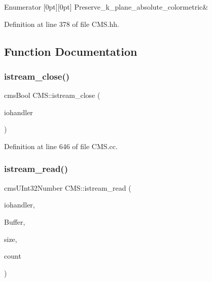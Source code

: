 \begin{DoxyEnumFields}{Enumerator}
[0pt][0pt]{}\mbox{\label{namespace_c_m_s_aabe6afbe3c2cd6188befc3096f1ea069ad691fc3212388b53f8e3d96349c66c82}} 
Preserve\+\_\+k\+\_\+plane\+\_\+absolute\+\_\+colormetric&\\
\hline

\end{DoxyEnumFields}


Definition at line 378 of file C\+M\+S.\+hh.



\subsection{Function Documentation}
\mbox{\label{namespace_c_m_s_a60036a5e1db6c4320d3ce599758c9101}} 
\subsubsection{\texorpdfstring{istream\+\_\+close()}{istream\_close()}}
{\footnotesize\ttfamily cms\+Bool C\+M\+S\+::istream\+\_\+close (\begin{DoxyParamCaption}\item[{cms\+I\+O\+H\+A\+N\+D\+L\+ER $\ast$}]{iohandler }\end{DoxyParamCaption})}



Definition at line 646 of file C\+M\+S.\+cc.

\mbox{\label{namespace_c_m_s_a88c40f3fde62e521d5f3b4055e6854e6}} 
\subsubsection{\texorpdfstring{istream\+\_\+read()}{istream\_read()}}
{\footnotesize\ttfamily cms\+U\+Int32\+Number C\+M\+S\+::istream\+\_\+read (\begin{DoxyParamCaption}\item[{cms\+I\+O\+H\+A\+N\+D\+L\+ER $\ast$}]{iohandler,  }\item[{void $\ast$}]{Buffer,  }\item[{cms\+U\+Int32\+Number}]{size,  }\item[{cms\+U\+Int32\+Number}]{count }\end{DoxyParamCaption})}



